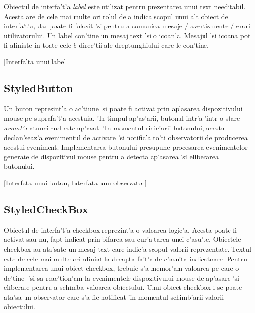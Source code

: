 Obiectul de interfa't'a \emph{label} este utilizat pentru prezentarea unui text needitabil. Acesta are de cele mai multe ori rolul de a indica scopul unui alt obiect de interfa't'a, dar poate fi folosit 'si pentru a comunica mesaje / avertismente / erori utilizatorului. Un label con'tine un mesaj text 'si o icoan'a. Mesajul 'si icoana pot fi aliniate in toate cele 9 direc'tii ale dreptunghiului care le con'tine.

[Interfa'ta unui label]


\subsection{StyledButton}

Un buton reprezint'a o ac'tiune 'si poate fi activat prin ap'asarea dispozitivului mouse pe suprafa't'a acestuia. 'In timpul ap'as'arii, butonul intr'a 'intr-o stare \emph{armat'a} atunci c{\ia}nd este ap'asat. 'In momentul ridic'arii butonului, acesta declan'seaz'a evenimentul de activare 'si notific'a to'ti observatorii de producerea acestui eveniment. Implementarea butonului presupune procesarea evenimentelor generate de dispozitivul mouse pentru a detecta ap'asarea 'si eliberarea butonului. 

[Interfata unui buton, Interfata unu observator]


\subsection{StyledCheckBox}

Obiectul de interfa't'a checkbox reprezint'a o valoarea logic'a. Acesta poate fi activat sau nu, fapt indicat prin bifarea sau cur'a'tarea unei c'asu'te. Obiectele checkbox au ata'sate un mesaj text care indic'a scopul valorii reprezentate. Textul este de cele mai multe ori aliniat la dreapta fa't'a de c'asu'ta indicatoare. Pentru implementarea unui obiect checkbox, trebuie s'a memor'am valoarea pe care o de'tine, 'si sa reac'tion'am la evenimentele dispozitivului mouse de ap'asare 'si eliberare pentru a schimba valoarea obiectului. Unui obiect checkbox i se poate ata'sa un observator care s'a fie notificat 'in momentul schimb'arii valorii obiectului.

